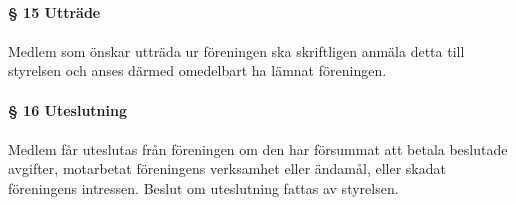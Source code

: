 \documentclass[12pt, a4paper]{article}
\begin{document}
\paragraph{§ 15 Utträde}
\paragraph{}
Medlem som önskar utträda ur föreningen ska skriftligen anmäla detta till styrelsen och anses därmed omedelbart ha lämnat föreningen.

\paragraph{§ 16 Uteslutning}
\paragraph{}
Medlem får uteslutas från föreningen om den har försummat att betala beslutade avgifter, motarbetat föreningens
verksamhet eller ändamål, eller skadat föreningens intressen. Beslut om uteslutning fattas av styrelsen.
\end{document}

